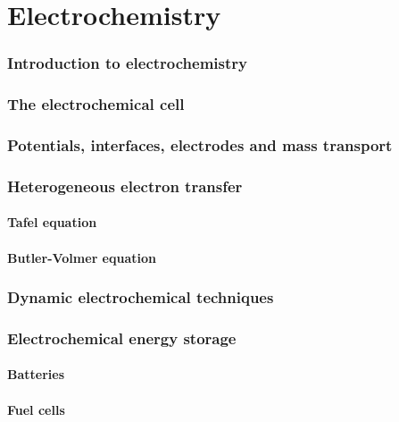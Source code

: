 \documentclass{article}
\numberwithin{theorem}{section}
\numberwithin{corollary}{section}
\numberwithin{postulate}{section}
\numberwithin{lemma}{section}
\numberwithin{definition}{section}
\begin{document}
\part{Electrochemistry}

\section{Introduction to electrochemistry}

\section{The electrochemical cell}

\section{Potentials, interfaces, electrodes and mass transport}

\section{Heterogeneous electron transfer}

\subsection{Tafel equation}

\subsection{Butler-Volmer equation}

\section{Dynamic electrochemical techniques}

\section{Electrochemical energy storage}

\subsection{Batteries}

\subsection{Fuel cells}
\end{document}
